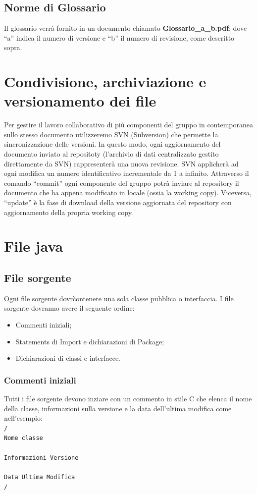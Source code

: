 \documentclass[11pt,titlepage,a4paper]{report}
\begin{document}
\section{Norme di Glossario}
Il glossario verr\`a fornito in un documento chiamato \textbf{ Glossario\_a\_b.pdf}; dove ``a'' indica il numero di versione e ``b'' il numero di revisione, come descritto sopra.

\chapter{Condivisione, archiviazione e versionamento dei file}
Per gestire il lavoro collaborativo di pi\`u componenti del gruppo in contemporanea sullo stesso documento utilizzeremo SVN (Subversion) che permette la sincronizzazione delle versioni. In questo modo, ogni aggiornamento del documento inviato al repositoty (l'archivio di dati centralizzato gestito direttamente da SVN) rappresenter\`a una nuova revisione. SVN applicher\`a ad ogni modifica un numero identificativo incrementale da 1 a infinito. Attraverso il comando ``commit'' ogni componente del gruppo potr\`a inviare al repository il documento che ha appena modificato in locale (ossia la working copy). Viceversa, ``update'' \`e la fase di download della versione aggiornata del repository con aggiornamento della propria working copy. 

\chapter{File java}
\section{File sorgente}
Ogni file sorgente dovr\` contenere una sola classe pubblica o interfaccia. I file sorgente dovranno avere il seguente ordine:
\begin{itemize}
\item Commenti iniziali;
\item Statements di Import e dichiarazioni di Package;
\item Dichiarazioni di classi e interfacce.
\end{itemize}
\subsection{Commenti iniziali}
Tutti i file sorgente devono inziare con un commento in stile C che elenca il nome della classe, informazioni sulla versione e la data dell'ultima modifica come nell'esempio: \\
 \newline
\texttt{/\ast \\
\ast Nome classe \\
\ast \\
\ast Informazioni Versione \\
\ast \\
\ast Data Ultima Modifica \\
\ast/ \\}
 \newline
\end{document}
